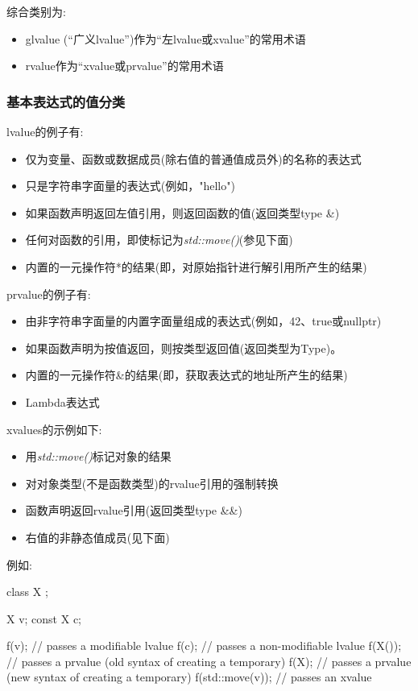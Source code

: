 综合类别为:

\begin{itemize}
	\item glvalue (“广义lvalue”)作为“左lvalue或xvalue”的常用术语
	\item rvalue作为“xvalue或prvalue”的常用术语
\end{itemize}

\subsubsection{基本表达式的值分类}

lvalue的例子有:

\begin{itemize}
	\item 仅为变量、函数或数据成员(除右值的普通值成员外)的名称的表达式
	\item 只是字符串字面量的表达式(例如，"hello")
	\item 如果函数声明返回左值引用，则返回函数的值(返回类型type \&)
	\item 任何对函数的引用，即使标记为\textit{std::move()}(参见下面)
	\item 内置的一元操作符*的结果(即，对原始指针进行解引用所产生的结果)
\end{itemize}

prvalue的例子有:

\begin{itemize}
	\item 由非字符串字面量的内置字面量组成的表达式(例如，42、true或nullptr)
	\item 如果函数声明为按值返回，则按类型返回值(返回类型为Type)。
	\item 内置的一元操作符\&的结果(即，获取表达式的地址所产生的结果)
	\item Lambda表达式
\end{itemize}

xvalues的示例如下:

\begin{itemize}
	\item 用\textit{std::move()}标记对象的结果
	\item 对对象类型(不是函数类型)的rvalue引用的强制转换
	\item 函数声明返回rvalue引用(返回类型type \&\&)
	\item 右值的非静态值成员(见下面)
\end{itemize}

例如:

\begin{cppcode}
class X {
};

X v;
const X c;

f(v); // passes a modifiable lvalue
f(c); // passes a non-modifiable lvalue
f(X()); // passes a prvalue (old syntax of creating a temporary)
f(X{}); // passes a prvalue (new syntax of creating a temporary)
f(std::move(v)); // passes an xvalue
\end{cppcode}

